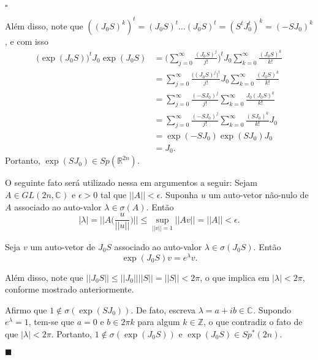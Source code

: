 \documentclass[12pt]{book}
\newenvironment{prova}[1]{$\square$ #1}{\hfill$\blacksquare$}
\newcommand{\bigparenteses}[1]{\Big( #1 \Big) }
\newcommand{\complexo}[1]{\mathbb{C}^{#1}}
\newcommand{\espectrooperador}[1]{\sigma(#1)}
\newcommand{\estruturacomplexa}{J_{0}}
\newcommand{\generalgroup}[2]{GL(#1, #2)}
\newcommand{\generalgroupcomplexo}[1]{\generalgroup{#1}{\complexo{}}}
\newcommand{\gruposimpletico}[1]{Sp(#1)}
\newcommand{\gruposimpleticonaodegenerado}[1]{Sp^{#1}(2n)}
\newcommand{\inteiros}{\mathbb{Z}}
\newcommand{\norma}[1]{||#1||}
\newcommand{\normagrande}[1]{\Big|\Big|#1\Big|\Big|}
\newcommand{\real}[1]{\mathbb{R}^{#1}}
\begin{document}
\begin{prova}
\begin{enumerate}
			Além disso, note que $((\estruturacomplexa S)^{k})^{t} = (\estruturacomplexa S)^{t}\dots (\estruturacomplexa S)^{t} = (S^{t}\estruturacomplexa^{t} )^{k} = (-S\estruturacomplexa)^{k}$, e com isso
			$$
			\begin{aligned}
			\big(\exp(\estruturacomplexa S)\big)^{t}\estruturacomplexa\exp(\estruturacomplexa S)
			&=\Big(\sum_{j=0}^{\infty}\frac{ (\estruturacomplexa S)^{j}}{j!}\Big)^{t} \estruturacomplexa \sum_{k=0}^{\infty}\frac{(\estruturacomplexa S)^{k}}{k!}
			\\
			&=\sum_{j=0}^{\infty}\frac{\big( (\estruturacomplexa S)^{j}\big)^{t}}{j!}\estruturacomplexa \sum_{k=0}^{\infty}\frac{(\estruturacomplexa S)^{k}}{k!}
			\\
			&=\sum_{j=0}^{\infty}\frac{(-S\estruturacomplexa)^{j}}{j!} \sum_{k=0}^{\infty}\frac{\estruturacomplexa(\estruturacomplexa S)^{k}}{k!}
			\\
			&=\sum_{j=0}^{\infty}\frac{(-S\estruturacomplexa)^{j}}{j!} \sum_{k=0}^{\infty}\frac{(S\estruturacomplexa)^{k}}{k!}\estruturacomplexa
			\\
			&=\exp(-S\estruturacomplexa)\exp(S\estruturacomplexa)\estruturacomplexa
			\\
			&=\estruturacomplexa.
			\end{aligned}
			$$
			Portanto, $\exp(S\estruturacomplexa) \in \gruposimpletico{\real{2n}}$. 
			
			O seguinte fato será utilizado nessa em argumentos a seguir: Sejam $A \in \generalgroupcomplexo{2n}$ e $\epsilon>0$ tal que $\norma{A}<\epsilon$. Suponha $u$ um auto-vetor não-nulo de $A$ associado ao auto-valor $\lambda\in \espectrooperador{A}$. Então 
			$$
				|\lambda|=\normagrande{A\bigparenteses{\frac{u}{\norma{u}}} }\leq \sup_{\norma{v}=1 } \norma{Av} = \norma{A}<\epsilon.
			$$
				
			
			Seja $v$ um auto-vetor de $\estruturacomplexa S$ associado ao auto-valor $\lambda \in \espectrooperador{\estruturacomplexa S}$. Então 
			$$
			\exp(\estruturacomplexa S)v = e^{\lambda}v.
			$$
			
			Além disso, note que $\norma{\estruturacomplexa S}\leq \norma{\estruturacomplexa}\norma{S} = \norma{S} <2\pi$, o que implica em $|\lambda|<2\pi$, conforme mostrado anteriormente.
			
			Afirmo que $1\notin \espectrooperador{\exp(S\estruturacomplexa)}$. De fato, escreva $\lambda = a+ib\in \complexo{}$. Supondo $e^{\lambda} = 1$, tem-se que $a=0$ e $b \in 2\pi k$ para algum $k\in \inteiros$, o que contradiz o fato de que $|\lambda| <2\pi$. Portanto, $1\notin\espectrooperador{\exp(\estruturacomplexa S)}$ e $\exp(\estruturacomplexa S)\in \gruposimpleticonaodegenerado{*}$.
			

\end{enumerate}
\end{prova}
\end{document}
